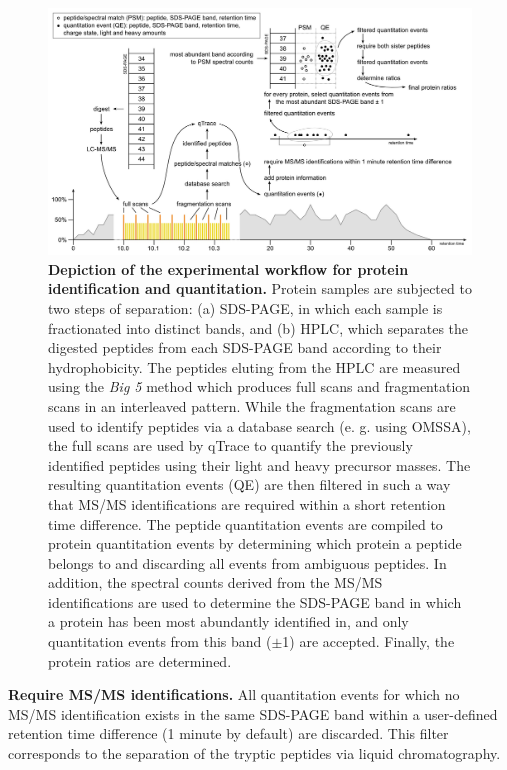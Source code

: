 \begin{figure}
\includegraphics[width=\textwidth]{figures/exp-setup.jpg}
\caption{
    {\bf Depiction of the experimental workflow for protein identification and 
    quantitation. }
    Protein samples are subjected to two steps of separation: (a) SDS-PAGE, in 
    which each sample is fractionated into distinct bands, and (b) HPLC, which 
    separates the digested peptides from each SDS-PAGE band according to their 
    hydrophobicity. 
    The peptides eluting from the HPLC are measured using the {\em Big 5} 
    method which produces full scans and fragmentation scans in an interleaved 
    pattern. 
    While the fragmentation scans are used to identify peptides via a database 
    search (e. g. using OMSSA), the full scans are used by qTrace to quantify 
    the previously identified peptides using their light and heavy precursor 
    masses.
    The resulting quantitation events (QE) are then filtered in such a way
    that MS/MS identifications are required within a short retention time 
    difference. 
    The peptide quantitation events are compiled to protein quantitation events
    by determining which protein a peptide belongs to and discarding all events
    from ambiguous peptides.
    In addition, the spectral counts derived from the MS/MS identifications are 
    used to determine the SDS-PAGE band in which a protein has been most 
    abundantly identified in, and only quantitation events from this band 
    ($\pm$1) are accepted.
    Finally, the protein ratios are determined.
}
\label{fig:exp-setup}
\end{figure}

{\bf Require MS/MS identifications.}
All quantitation events for which no MS/MS identification exists in the same 
SDS-PAGE band within a user-defined retention time difference (1 minute by 
default) are discarded. This filter corresponds to the separation of the 
tryptic peptides via liquid chromatography.

